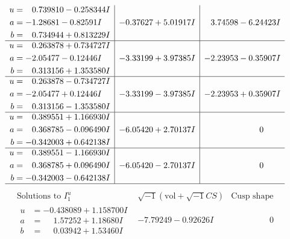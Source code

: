 \documentclass[1p]{elsarticle_modified}
\theoremstyle{definition}
\newcommand{\I}{\sqrt{-1}}
\begin{document}
$$\begin{array}{c|c|c}
\begin{aligned}
u &= \phantom{-}0.739810 - 0.258344 I \\
a &= -1.28681 - 0.82591 I \\
b &= \phantom{-}0.734944 + 0.813229 I\end{aligned}
 & -0.37627 + 5.01917 I & \phantom{-}3.74598 - 6.24423 I \\ \hline\begin{aligned}
u &= \phantom{-}0.263878 + 0.734727 I \\
a &= -2.05477 - 0.12446 I \\
b &= \phantom{-}0.313156 + 1.353580 I\end{aligned}
 & -3.33199 + 3.97385 I & -2.23953 - 0.35907 I \\ \hline\begin{aligned}
u &= \phantom{-}0.263878 - 0.734727 I \\
a &= -2.05477 + 0.12446 I \\
b &= \phantom{-}0.313156 - 1.353580 I\end{aligned}
 & -3.33199 - 3.97385 I & -2.23953 + 0.35907 I \\ \hline\begin{aligned}
u &= \phantom{-}0.389551 + 1.166930 I \\
a &= \phantom{-}0.368785 - 0.096490 I \\
b &= -0.342003 + 0.642138 I\end{aligned}
 & -6.05420 + 2.70137 I & \phantom{-0.000000 } 0 \\ \hline\begin{aligned}
u &= \phantom{-}0.389551 - 1.166930 I \\
a &= \phantom{-}0.368785 + 0.096490 I \\
b &= -0.342003 - 0.642138 I\end{aligned}
 & -6.05420 - 2.70137 I & \phantom{-0.000000 } 0\\
 \hline 
 \end{array}$$\newpage$$\begin{array}{c|c|c}  
\text{Solutions to }I^u_{1}& \I (\text{vol} + \sqrt{-1}CS) & \text{Cusp shape}\\
 \hline 
\begin{aligned}
u &= -0.438089 + 1.158700 I \\
a &= \phantom{-}1.57252 + 1.18680 I \\
b &= \phantom{-}0.03942 + 1.53460 I\end{aligned}
 & -7.79249 - 0.92626 I & \phantom{-0.000000 } 0 \\ \hline\begin{aligned}

\end{aligned}
\end{array}$$
\end{document}
